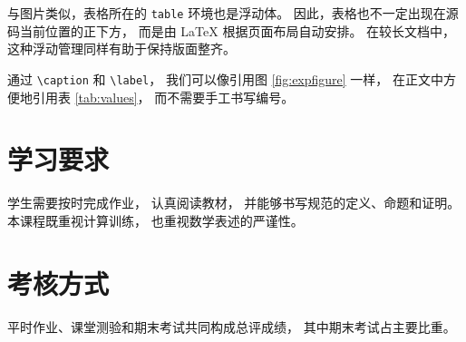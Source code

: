 \documentclass[UTF8]{ctexart}
\numberwithin{equation}{section}
\begin{document}
与图片类似，表格所在的 \texttt{table} 环境也是浮动体。
因此，表格也不一定出现在源码当前位置的正下方，
而是由 LaTeX 根据页面布局自动安排。
在较长文档中，这种浮动管理同样有助于保持版面整齐。

通过 \texttt{\textbackslash caption} 和 \texttt{\textbackslash label}，
我们可以像引用图 \ref{fig:expfigure} 一样，
在正文中方便地引用表 \ref{tab:values}，
而不需要手工书写编号。

\section{学习要求}

学生需要按时完成作业，
认真阅读教材，
并能够书写规范的定义、命题和证明。
本课程既重视计算训练，
也重视数学表述的严谨性。

\section{考核方式}

平时作业、课堂测验和期末考试共同构成总评成绩，
其中期末考试占主要比重。
\end{document}
